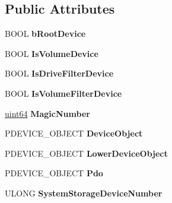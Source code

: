 \subsection*{Public Attributes}
\begin{DoxyCompactItemize}
\item 
\mbox{\label{struct___drive_filter_extension_a235a40d9f1b0b43fc0d551836240efbc}} 
B\+O\+OL {\bfseries b\+Root\+Device}
\item 
\mbox{\label{struct___drive_filter_extension_af316bac183ef6817e2c08270357ff182}} 
B\+O\+OL {\bfseries Is\+Volume\+Device}
\item 
\mbox{\label{struct___drive_filter_extension_a65445cb22a3bcce79642f97a602cd920}} 
B\+O\+OL {\bfseries Is\+Drive\+Filter\+Device}
\item 
\mbox{\label{struct___drive_filter_extension_a2039d0dbea0c06bdb3271ac565e726c3}} 
B\+O\+OL {\bfseries Is\+Volume\+Filter\+Device}
\item 
\mbox{\label{struct___drive_filter_extension_a8c72b8bbc17ca7d14f0367b3c1953d4a}} 
\hyperlink{union_u_i_n_t64___s_t_r_u_c_t}{uint64} {\bfseries Magic\+Number}
\item 
\mbox{\label{struct___drive_filter_extension_a7e4adb5c5fa0e2ce5be315e0c1a6fb6b}} 
P\+D\+E\+V\+I\+C\+E\+\_\+\+O\+B\+J\+E\+CT {\bfseries Device\+Object}
\item 
\mbox{\label{struct___drive_filter_extension_ab88c602bb954cc3632adb50627db449d}} 
P\+D\+E\+V\+I\+C\+E\+\_\+\+O\+B\+J\+E\+CT {\bfseries Lower\+Device\+Object}
\item 
\mbox{\label{struct___drive_filter_extension_af0912ac366e2063ff616a9a09b137c21}} 
P\+D\+E\+V\+I\+C\+E\+\_\+\+O\+B\+J\+E\+CT {\bfseries Pdo}
\item 
\mbox{\label{struct___drive_filter_extension_ac33e5258421115244ca5d877b83fd7f1}} 
U\+L\+O\+NG {\bfseries System\+Storage\+Device\+Number}

\end{DoxyCompactItemize}

